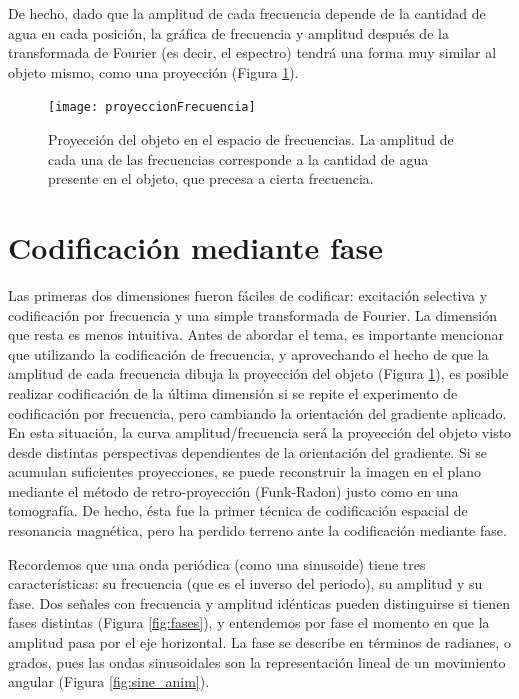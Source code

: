 De hecho, dado que la amplitud de cada frecuencia depende de la cantidad de agua en cada posición, la gráfica de frecuencia y amplitud después de la transformada de Fourier (es decir, el espectro) tendrá una forma muy similar al objeto mismo, como una proyección (Figura \ref{fig:proyeccionFrecuencia}).

\begin{figure}[htb]
 \begin{figg}
   \texttt{[image: proyeccionFrecuencia]}
   \caption{Proyección del objeto en el espacio de frecuencias. La amplitud de cada una de las frecuencias corresponde a la cantidad de agua presente en el objeto, que precesa a cierta frecuencia.}
 \label{fig:proyeccionFrecuencia}
 \end{figg}
\end{figure}


\section{Codificación mediante fase}
Las primeras dos dimensiones fueron fáciles de codificar: excitación selectiva y codificación por frecuencia y una simple transformada de Fourier. La dimensión que resta es menos intuitiva. Antes de abordar el tema, es importante mencionar que utilizando la codificación de frecuencia, y aprovechando el hecho de que la amplitud de cada frecuencia dibuja la proyección del objeto (Figura \ref{fig:proyeccionFrecuencia}), es posible realizar codificación de la última dimensión si se repite el experimento de codificación por frecuencia, pero cambiando la orientación del gradiente aplicado. En esta situación, la curva amplitud/frecuencia será la proyección del objeto visto desde distintas perspectivas dependientes de la orientación del gradiente. Si se acumulan suficientes proyecciones, se puede reconstruir la imagen en el plano mediante el método de retro-proyección (Funk-Radon) justo como en una tomografía. De hecho, ésta fue la primer técnica de codificación espacial de resonancia magnética, pero ha perdido terreno ante la codificación mediante fase.

Recordemos que una onda periódica (como una sinusoide) tiene tres características: su frecuencia (que es el inverso del periodo), su amplitud y su fase. Dos señales con frecuencia y amplitud idénticas pueden distinguirse si tienen fases distintas (Figura \ref{fig:fases}), y entendemos por fase el momento en que la amplitud pasa por el eje horizontal. La fase se describe en términos de radianes, o grados, pues las ondas sinusoidales son la representación lineal de un movimiento angular (Figura \ref{fig:sine_anim}).


